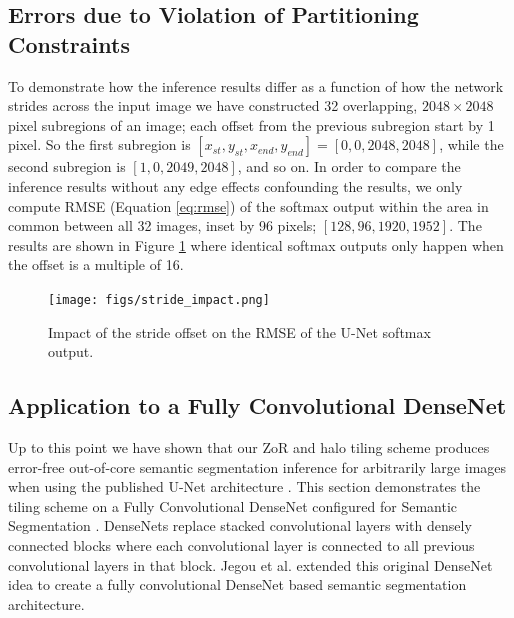 \documentclass[runningheads]{llncs}
\begin{document}
\subsection{Errors due to Violation of Partitioning Constraints}

To demonstrate how the inference results differ as a function of how the network strides across the input image we have constructed 32 overlapping, $2048 \times 2048$ pixel subregions of an image; each offset from the previous subregion start by 1 pixel. So the first subregion is $[x_{st}, y_{st}, x_{end}, y_{end}] = [0, 0, 2048, 2048]$, while the second subregion is $[1, 0, 2049, 2048]$, and so on. In order to compare the inference results without any edge effects confounding the results, we only compute RMSE (Equation \ref{eq:rmse}) of the softmax output within the area in common between all 32 images, inset by 96 pixels; $[128, 96, 1920, 1952]$. The results are shown in Figure \ref{fig:stride-impact} where identical softmax outputs only happen when the offset is a multiple of 16.

\begin{figure}
	\texttt{[image: figs/stride\_impact.png]}
	
	\caption{Impact of the stride offset on the RMSE of the U-Net softmax output.}
	\label{fig:stride-impact}
\end{figure} 

%

\subsection{Application to a Fully Convolutional DenseNet}

Up to this point we have shown that our ZoR and halo tiling scheme produces error-free out-of-core semantic segmentation inference for arbitrarily large images when using the published U-Net architecture \cite{Ronneberger2015a}. 
This section demonstrates the tiling scheme on a Fully Convolutional DenseNet configured for Semantic Segmentation \cite{Jegou2017}. DenseNets \cite{Huang2017} replace stacked convolutional layers with densely connected blocks where each convolutional layer is connected to all previous convolutional layers in that block. Jegou et al. \cite{Jegou2017} extended this original DenseNet idea to create a fully convolutional DenseNet based semantic segmentation architecture. 
\end{document}
